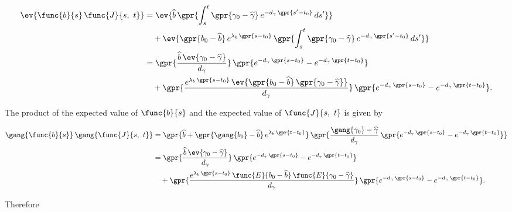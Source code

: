 \begin{align}
    \ev{\func{b}{s}\,\func{J}{s,\ t}} &= \ev{\widehat{b}\,\gpr{\int_{s}^{t} \gpr{\gamma_0 - \widehat{\gamma}}\,e^{-d_{\gamma}\,\gpr{s' - t_0}}\,ds'}} \nonumber \\
    		&\quad + \ev{\gpr{b_0 - \widehat{b}}\,e^{\lambda_{b}\,\gpr{s - t_0}}\,\gpr{\int_{s}^{t} \gpr{\gamma_0 - \widehat{\gamma}}\,e^{-d_{\gamma}\,\gpr{s' - t_0}}\,ds'}} \nonumber \\
    	&= \gpr{\frac{\widehat{b}\,\ev{\gamma_0 - \widehat{\gamma}}}{d_{\gamma}}}\,\gpr{e^{-d_{\gamma}\,\gpr{s - t_0}} - e^{-d_{\gamma}\,\gpr{t - t_0}}} \nonumber \\
    		&\quad + \gpr{\frac{e^{\lambda_{b}\,\gpr{s - t_0}}\,\ev{\gpr{b_0 - \widehat{b}}\,\gpr{\gamma_0 - \widehat{\gamma}}}}{d_{\gamma}}}\,\gpr{e^{-d_{\gamma}\,\gpr{s - t_0}} - e^{-d_{\gamma}\,\gpr{t - t_0}}}.
\end{align}

The product of the expected value of $\func{b}{s}$ and the expected value of $\func{J}{s,\ t}$ is given by

\begin{align}
    \gang{\func{b}{s}}\,\gang{\func{J}{s,\ t}} &= \gpr{\widehat{b} + \gpr{\gang{b_0} - \widehat{b}}\,e^{\lambda_{b}\,\gpr{t - t_0}}}\,\gpr{\frac{\gang{\gamma_0} - \widehat{\gamma}}{d_{\gamma}}\,\gpr{e^{-d_{\gamma}\,\gpr{s - t_0}} - e^{-d_{\gamma}\,\gpr{t - t_0}}}} \nonumber \\
    	&= \gpr{\frac{\widehat{b}\,\ev{\gamma_0 - \widehat{\gamma}}}{d_{\gamma}}}\,\gpr{e^{-d_{\gamma}\,\gpr{s - t_0}} - e^{-d_{\gamma}\,\gpr{t - t_0}}} \nonumber \\
    		&\quad + \gpr{\frac{e^{\lambda_{b}\,\gpr{s - t_0}}\,\func{E}{b_0 - \widehat{b}}\,\func{E}{\gamma_0 - \widehat{\gamma}}}{d_{\gamma}}}\,\gpr{e^{-d_{\gamma}\,\gpr{s - t_0}} - e^{-d_{\gamma}\,\gpr{t - t_0}}}.
\end{align}

Therefore

